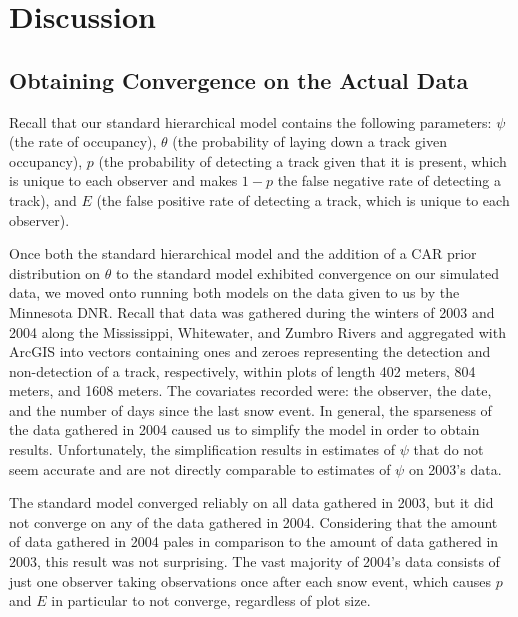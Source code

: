 \documentclass{article}
\begin{document}
\section{Discussion}

    \subsection{Obtaining Convergence on the Actual Data}
    Recall that our standard hierarchical model contains the following
    parameters: \(\psi\) (the rate of occupancy), \(\theta\) (the probability
    of laying down a track given occupancy), \(p\) (the probability of
    detecting a track given that it is present, which is unique to each
    observer and makes \(1-p\) the false negative rate of detecting a track),
    and \(E\) (the false positive rate of detecting a track, which is unique to
    each observer).

    Once both the standard hierarchical model and the addition of a CAR prior
    distribution on \(\theta\) to the standard model exhibited convergence on
    our simulated data, we moved onto running both models on the data given to
    us by the Minnesota DNR.  Recall that data was gathered during the winters
    of 2003 and 2004 along the Mississippi, Whitewater, and Zumbro Rivers and
    aggregated with ArcGIS into vectors containing ones and zeroes representing
    the detection and non-detection of a track, respectively, within plots of
    length 402 meters, 804 meters, and 1608 meters.  The covariates recorded
    were: the observer, the date, and the number of days since the last snow
    event.  In general, the sparseness of the data gathered in 2004 caused us
    to simplify the model in order to obtain results.  Unfortunately, the
    simplification results in estimates of \(\psi\) that do not seem accurate
    and are not directly comparable to estimates of \(\psi\) on 2003's data.

    The standard model converged reliably on all data gathered in 2003, but it
    did not converge on any of the data gathered in 2004.  Considering that the
    amount of data gathered in 2004 pales in comparison to the amount of data
    gathered in 2003, this result was not surprising.  The vast majority of
    2004's data consists of just one observer taking observations once after
    each snow event, which causes \(p\) and \(E\) in particular to not converge,
    regardless of plot size.
\end{document}
